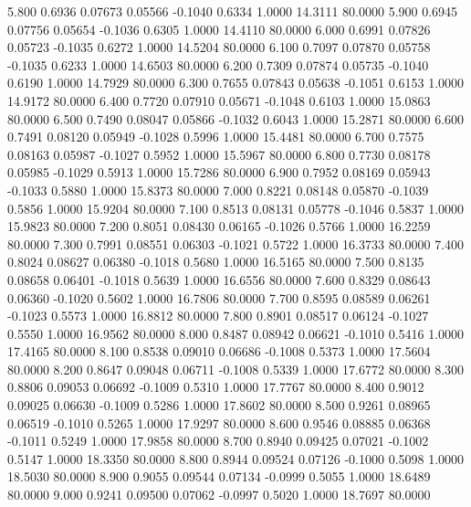    5.800   0.6936   0.07673   0.05566  -0.1040   0.6334   1.0000  14.3111  80.0000
   5.900   0.6945   0.07756   0.05654  -0.1036   0.6305   1.0000  14.4110  80.0000
   6.000   0.6991   0.07826   0.05723  -0.1035   0.6272   1.0000  14.5204  80.0000
   6.100   0.7097   0.07870   0.05758  -0.1035   0.6233   1.0000  14.6503  80.0000
   6.200   0.7309   0.07874   0.05735  -0.1040   0.6190   1.0000  14.7929  80.0000
   6.300   0.7655   0.07843   0.05638  -0.1051   0.6153   1.0000  14.9172  80.0000
   6.400   0.7720   0.07910   0.05671  -0.1048   0.6103   1.0000  15.0863  80.0000
   6.500   0.7490   0.08047   0.05866  -0.1032   0.6043   1.0000  15.2871  80.0000
   6.600   0.7491   0.08120   0.05949  -0.1028   0.5996   1.0000  15.4481  80.0000
   6.700   0.7575   0.08163   0.05987  -0.1027   0.5952   1.0000  15.5967  80.0000
   6.800   0.7730   0.08178   0.05985  -0.1029   0.5913   1.0000  15.7286  80.0000
   6.900   0.7952   0.08169   0.05943  -0.1033   0.5880   1.0000  15.8373  80.0000
   7.000   0.8221   0.08148   0.05870  -0.1039   0.5856   1.0000  15.9204  80.0000
   7.100   0.8513   0.08131   0.05778  -0.1046   0.5837   1.0000  15.9823  80.0000
   7.200   0.8051   0.08430   0.06165  -0.1026   0.5766   1.0000  16.2259  80.0000
   7.300   0.7991   0.08551   0.06303  -0.1021   0.5722   1.0000  16.3733  80.0000
   7.400   0.8024   0.08627   0.06380  -0.1018   0.5680   1.0000  16.5165  80.0000
   7.500   0.8135   0.08658   0.06401  -0.1018   0.5639   1.0000  16.6556  80.0000
   7.600   0.8329   0.08643   0.06360  -0.1020   0.5602   1.0000  16.7806  80.0000
   7.700   0.8595   0.08589   0.06261  -0.1023   0.5573   1.0000  16.8812  80.0000
   7.800   0.8901   0.08517   0.06124  -0.1027   0.5550   1.0000  16.9562  80.0000
   8.000   0.8487   0.08942   0.06621  -0.1010   0.5416   1.0000  17.4165  80.0000
   8.100   0.8538   0.09010   0.06686  -0.1008   0.5373   1.0000  17.5604  80.0000
   8.200   0.8647   0.09048   0.06711  -0.1008   0.5339   1.0000  17.6772  80.0000
   8.300   0.8806   0.09053   0.06692  -0.1009   0.5310   1.0000  17.7767  80.0000
   8.400   0.9012   0.09025   0.06630  -0.1009   0.5286   1.0000  17.8602  80.0000
   8.500   0.9261   0.08965   0.06519  -0.1010   0.5265   1.0000  17.9297  80.0000
   8.600   0.9546   0.08885   0.06368  -0.1011   0.5249   1.0000  17.9858  80.0000
   8.700   0.8940   0.09425   0.07021  -0.1002   0.5147   1.0000  18.3350  80.0000
   8.800   0.8944   0.09524   0.07126  -0.1000   0.5098   1.0000  18.5030  80.0000
   8.900   0.9055   0.09544   0.07134  -0.0999   0.5055   1.0000  18.6489  80.0000
   9.000   0.9241   0.09500   0.07062  -0.0997   0.5020   1.0000  18.7697  80.0000
